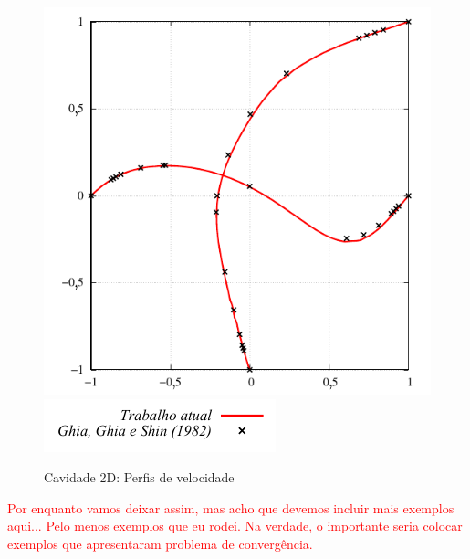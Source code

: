 \begin{figure}[!!htbp]
	\caption{Cavidade 2D: Perfis de velocidade} 
	\centering
	{\includegraphics[scale=0.8,trim=0cm 0cm 0cm 0cm, clip=true]{Imagens/Cap5/cav2d_perfil_vel_Re100.pdf}}\\
	{\includegraphics[scale=1.0,trim=0cm 0cm 0cm 0cm, clip=true]{Imagens/Cap5/cav2d_legenda.pdf}}
	\label{fig:cav2d_perfil_vel_Re100}
\end{figure}

\textcolor{red}{Por enquanto vamos deixar assim, mas acho que devemos incluir mais exemplos aqui... Pelo menos exemplos que eu rodei. Na verdade, o importante seria colocar exemplos que apresentaram problema de convergência.}
